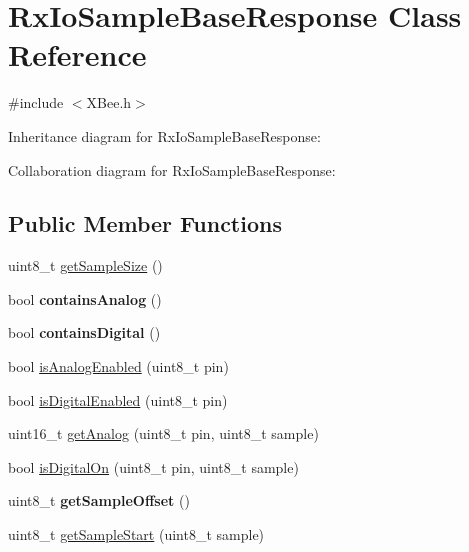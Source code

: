 \hypertarget{class_rx_io_sample_base_response}{}\section{Rx\+Io\+Sample\+Base\+Response Class Reference}
\label{class_rx_io_sample_base_response}


{\ttfamily \#include $<$X\+Bee.\+h$>$}



Inheritance diagram for Rx\+Io\+Sample\+Base\+Response\+:


Collaboration diagram for Rx\+Io\+Sample\+Base\+Response\+:
\subsection*{Public Member Functions}
\begin{DoxyCompactItemize}
\item 
uint8\+\_\+t \hyperlink{class_rx_io_sample_base_response_a44ce66a6751e7e39c8908fe179a21d24}{get\+Sample\+Size} ()
\item 
\hypertarget{class_rx_io_sample_base_response_a9c6f6e1b7b8659ea086084ca35f9f83b}{}\label{class_rx_io_sample_base_response_a9c6f6e1b7b8659ea086084ca35f9f83b} 
bool {\bfseries contains\+Analog} ()
\item 
\hypertarget{class_rx_io_sample_base_response_ae70a93197c9e2fa6cfd5d64e189f0690}{}\label{class_rx_io_sample_base_response_ae70a93197c9e2fa6cfd5d64e189f0690} 
bool {\bfseries contains\+Digital} ()
\item 
bool \hyperlink{class_rx_io_sample_base_response_ad8fc07932c2e011b83814082b1d82400}{is\+Analog\+Enabled} (uint8\+\_\+t pin)
\item 
bool \hyperlink{class_rx_io_sample_base_response_aa897267985b5b8c02abd68b50f954de7}{is\+Digital\+Enabled} (uint8\+\_\+t pin)
\item 
uint16\+\_\+t \hyperlink{class_rx_io_sample_base_response_a81e98b2eab33f62e6af6b3b4014e841a}{get\+Analog} (uint8\+\_\+t pin, uint8\+\_\+t sample)
\item 
bool \hyperlink{class_rx_io_sample_base_response_ad4ffc0eb84c685fe45618d6b73a20ce2}{is\+Digital\+On} (uint8\+\_\+t pin, uint8\+\_\+t sample)
\item 
\hypertarget{class_rx_io_sample_base_response_a78098028dec69c655a190fb8d3cee333}{}\label{class_rx_io_sample_base_response_a78098028dec69c655a190fb8d3cee333} 
uint8\+\_\+t {\bfseries get\+Sample\+Offset} ()
\item 
uint8\+\_\+t \hyperlink{class_rx_io_sample_base_response_a303145668b9624e07868d0a1a835c4b4}{get\+Sample\+Start} (uint8\+\_\+t sample)
\end{DoxyCompactItemize}
